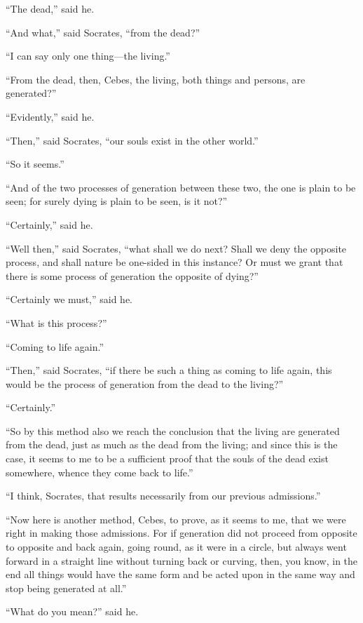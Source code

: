 \documentclass[letterpaper,12pt]{article}
\newcommand{\stephpag}[1]{\marginnote{\small\itshape\fontfamily{ppl}\selectfont #1}}
\begin{document}
\begin{drama}
``The dead,'' said he.
 
``And what,'' said Socrates, ``from the dead?''
 
``I can say only one thing---the living.''
 
``From the dead, then, Cebes, the living, both things and persons, \stephpag{e} are generated?''
 
``Evidently,'' said he.
 
``Then,'' said Socrates, ``our souls exist in the other world.''
 
``So it seems.''
 
``And of the two processes of generation between these two, the one is plain to be seen; for surely dying is plain to be seen, is it not?''
 
``Certainly,'' said he.
 
``Well then,'' said Socrates, ``what shall we do next? Shall we deny the opposite process, and shall nature be one-sided in this instance? Or must we grant that there is some process of generation the opposite of dying?''
 
``Certainly we must,'' said he.
 
``What is this process?''
 
``Coming to life again.''
 
``Then,'' said Socrates, ``if there be such a thing as \stephpag{72 a} coming to life again, this would be the process of generation from the dead to the living?''
 
``Certainly.''
 
``So by this method also we reach the conclusion that the living are generated from the dead, just as much as the dead from the living; and since this is the case, it seems to me to be a sufficient proof that the souls of the dead exist somewhere, whence they come back to life.''
 
``I think, Socrates, that results necessarily from our previous admissions.''
 
``Now here is another method, Cebes, to prove, as it seems to me, that we were right in making those admissions. \stephpag{b} For if generation did not proceed from opposite to opposite and back again, going round, as it were in a circle, but always went forward in a straight line without turning back or curving, then, you know, in the end all things would have the same form and be acted upon in the same way and stop being generated at all.''
 
``What do you mean?'' said he.
 

\end{drama}
\end{document}
